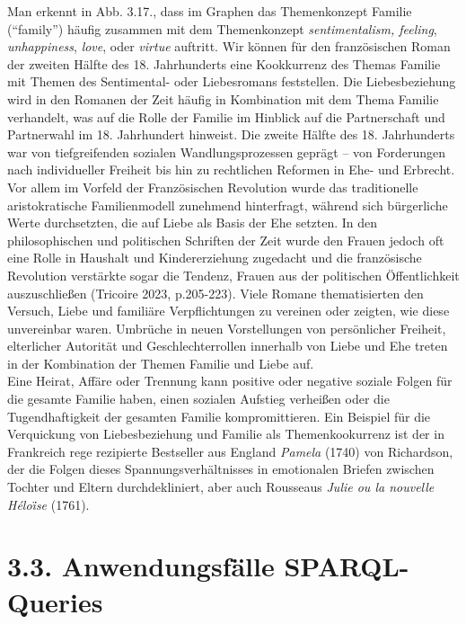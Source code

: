 \documentclass[
  12pt,
  letterpaper,
  DIV=11,
  numbers=noendperiod]{scrreprt}
\begin{document}
Man erkennt in Abb. 3.17., dass im Graphen das Themenkonzept Familie
(``family'') häufig zusammen mit dem Themenkonzept \emph{sentimentalism,
feeling}, \emph{unhappiness}, \emph{love}, oder \emph{virtue} auftritt.
Wir können für den französischen Roman der zweiten Hälfte des 18.
Jahrhunderts eine Kookkurrenz des Themas Familie mit Themen des
Sentimental- oder Liebesromans feststellen. Die Liebesbeziehung wird in
den Romanen der Zeit häufig in Kombination mit dem Thema Familie
verhandelt, was auf die Rolle der Familie im Hinblick auf die
Partnerschaft und Partnerwahl im 18. Jahrhundert hinweist. Die zweite
Hälfte des 18. Jahrhunderts war von tiefgreifenden sozialen
Wandlungsprozessen geprägt -- von Forderungen nach individueller
Freiheit bis hin zu rechtlichen Reformen in Ehe- und Erbrecht. Vor allem
im Vorfeld der Französischen Revolution wurde das traditionelle
aristokratische Familienmodell zunehmend hinterfragt, während sich
bürgerliche Werte durchsetzten, die auf Liebe als Basis der Ehe setzten.
In den philosophischen und politischen Schriften der Zeit wurde den
Frauen jedoch oft eine Rolle in Haushalt und Kindererziehung zugedacht
und die französische Revolution verstärkte sogar die Tendenz, Frauen aus
der politischen Öffentlichkeit auszuschließen (Tricoire 2023,
p.205-223). Viele Romane thematisierten den Versuch, Liebe und familiäre
Verpflichtungen zu vereinen oder zeigten, wie diese unvereinbar waren.
Umbrüche in neuen Vorstellungen von persönlicher Freiheit, elterlicher
Autorität und Geschlechterrollen innerhalb von Liebe und Ehe treten in
der Kombination der Themen Familie und Liebe auf.\\
Eine Heirat, Affäre oder Trennung kann positive oder negative soziale
Folgen für die gesamte Familie haben, einen sozialen Aufstieg verheißen
oder die Tugendhaftigkeit der gesamten Familie kompromittieren. Ein
Beispiel für die Verquickung von Liebesbeziehung und Familie als
Themenkookurrenz ist der in Frankreich rege rezipierte Bestseller aus
England \emph{Pamela} (1740) von Richardson, der die Folgen dieses
Spannungsverhältnisses in emotionalen Briefen zwischen Tochter und
Eltern durchdekliniert, aber auch Rousseaus \emph{Julie ou la nouvelle
Héloi͏̈se} (1761).


\chapter{3.3. Anwendungsfälle \textbar{}
SPARQL-Queries}\label{anwendungsfuxe4lle-sparql-queries}
\end{document}

